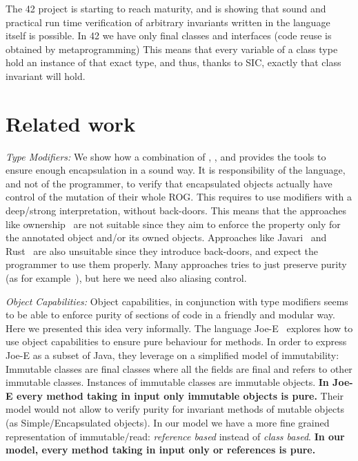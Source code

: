 The 42 project is starting to reach maturity, and is showing that sound and practical
 run time verification of arbitrary invariants written in the language itself is possible. 
In 42 we have only final classes and interfaces (code reuse is obtained by metaprogramming)
This means that every variable of a class type hold an instance of that exact type, and 
thus, thanks to SIC, exactly that class invariant will hold.



\saveSpace
\section{Related work}
\label{s:related}
\saveSpace
\noindent\textit{Type Modifiers:}
We show how a combination of
\Q@mut@, \Q@imm@, \Q@read@ and \Q@capsule@ provides the tools to ensure enough encapsulation in a sound way. 
It is responsibility of the language, and not of the programmer,
to verify that encapsulated objects actually have control of the mutation of their whole ROG.
This requires to use modifiers with a deep/strong interpretation, without back-doors.
This means that the approaches like ownership~\cite{ClarkeEtAl13,ZibinEtAl10,DietlEtAl07}
are not suitable since they aim to enforce the property only for
the annotated object and/or its owned objects.
Approaches like Javari~\cite{TschantzErnst05,Boyland06} and Rust~\cite{matsakis2014rust}
are also unsuitable since they introduce back-doors, and expect the programmer to use them properly.
Many approaches tries to just preserve purity (as for example~\cite{pearce2011jpure}), but here we need also aliasing control.


\noindent
\textit{Object Capabilities:}
Object capabilities, in conjunction with type modifiers seems to be able to
 enforce purity of sections of code in a friendly and modular way.
Here we presented this idea very informally.
The language Joe-E~\cite{finifter2008verifiable}
explores how to use object capabilities to ensure
pure behaviour for methods.
In order to express Joe-E as a subset of Java,
they leverage on a simplified model of immutability:
Immutable classes are final classes where all the fields are final and refers to other immutable classes.
Instances of immutable classes are immutable objects.
\textbf{In Joe-E every method taking in input only immutable objects is pure.}
Their model would not allow to verify purity for invariant methods of mutable objects
 (as Simple/Encapsulated objects).
In our model we have a more fine grained representation of immutable/read:
 \emph{reference based} instead of \emph{class based}.
\textbf{
In our model, every method taking in input only \Q@read@ or \Q@imm@ references is pure.
}


